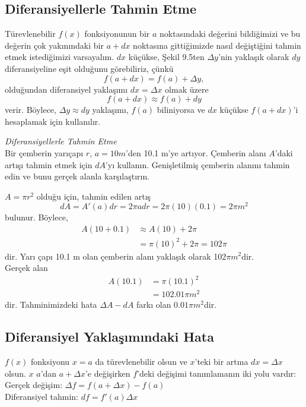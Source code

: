 \subsection{\protect Diferansiyellerle Tahmin Etme}
Türevlenebilir $f(x)$ fonksiyonunun bir $a$ noktasındaki değerini bildiğimizi ve bu değerin çok yakınındaki bir $a+dx$ noktasına gittiğimizde nasıl değiştiğini tahmin etmek istediğimizi varsayalım. $dx$ küçükse, Şekil 9.5ten $\varDelta y$'nin yaklaşık olarak $dy$ diferansiyeline eşit olduğunu görebiliriz, çünkü
	\begin{equation*}
	f(a+dx)=f(a)+ \varDelta y,
	\end{equation*}
olduğundan diferansiyel yaklaşımı $dx=\varDelta x$ olmak üzere
	\begin{equation*}
	f(a+dx)\approx f(a)+dy
	\end{equation*}
verir. Böylece, $\varDelta y \approx dy$ yaklaşımı, $f(a)$ biliniyorsa ve $dx$ küçükse $f(a+dx)$'i hesaplamak için kullanılır.
\begin{ornek}\textit{Diferansiyellerle Tahmin Etme}\\
Bir çemberin yarıçapı $r$, $a=10 m$'den 10.1 m'ye artıyor. Çemberin alanı $A$'daki artışı tahmin etmek için $dA$'yı kullanın. Genişletilmiş çemberin alanını tahmin edin ve bunu gerçek alanla karşılaştırın.
\end{ornek}
\begin{cozum}
$A=\pi r^2$ olduğu için, tahmin edilen artış
	\begin{equation*}
	dA=A'(a)dr=2\pi a dr = 2\pi (10)(0.1)=2\pi m^2
	\end{equation*}
bulunur. Böylece,
	\begin{equation*}
	\begin{split}
	A(10+0.1)&\approx A(10)+2\pi \\
	&=\pi(10)^2+2\pi=102\pi
	\end{split}
	\end{equation*}
dir. Yarı çapı 10.1 m olan çemberin alanı yaklaşık olarak 102$\pi m^2$dir.\\
Gerçek alan
	\begin{equation*}
	\begin{split}
	A(10.1)&=\pi(10.1)^2\\
	&=102.01 \pi m^2
	\end{split}
	\end{equation*}
dir. Tahminimizdeki hata $\varDelta A-dA$ farkı olan $0.01 \pi m^2$dir.
\end{cozum}
\subsection{\protect Diferansiyel Yaklaşımındaki Hata}
$f(x)$ fonksiyonu $x=a$ da türevlenebilir olsun ve $x$'teki bir artma $dx=\varDelta x$ olsun. $x$ $a$'dan $a+\varDelta x$'e değişirken $f$'deki değişimi tanımlamanın iki yolu vardır:\\
Gerçek değişim:		$\varDelta f=f(a+ \varDelta x)-f(a)$\\
Diferansiyel tahmin:	$df=f'(a) \varDelta x$\\

